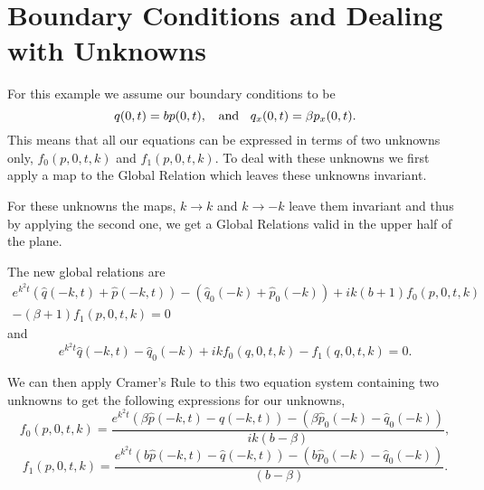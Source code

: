 \documentclass{article}
\begin{document}
\section{Boundary Conditions and Dealing with Unknowns}
For this example we assume our boundary conditions to be
\begin{equation}\label{eq:36}
    q(0,t) = bp(0,t), \hspace{0.75pc} \text{and} \hspace{0.75pc} q_x(0,t) = \beta p_x(0,t).
\end{equation}
This means that all our equations can be expressed in terms of two unknowns only, $f_0(p,0,t,k)$ and $f_1(p,0,t,k)$. To deal with these unknowns we first apply a map to the Global Relation which leaves these unknowns invariant.

For these unknowns the maps, $k \to k$ and $k \to -k$ leave them invariant and thus by applying the second one, we get a Global Relations valid in the upper half of the plane.

The new global relations are 
\begin{multline} \label{eq:37}
   e^{k^2t}(\hat{q}(-k,t) + \hat{p}(-k,t)) - (\hat{q}_0(-k) + \hat{p}_0(-k)) + ik(b+1)f_0(p,0,t,k) \\ - (\beta+1) f_1(p,0,t,k) = 0 
\end{multline}
and
\begin{equation} \label{eq:38}
    e^{k^2t}\hat{q}(-k,t) - \hat{q}_0(-k) + ikf_0(q,0,t,k) -f_1(q,0,t,k) = 0.
\end{equation}

We can then apply Cramer's Rule to this two equation system containing two unknowns to get the following expressions for our unknowns,
\begin{equation} \label{eq:39}
    f_0(p,0,t,k) = \frac{e^{k^2t}(\beta\hat{p}(-k,t) - \hat{q}(-k,t)) - (\beta\hat{p}_0(-k) - \hat{q}_0(-k))}{ik(b-\beta)},
\end{equation}
\begin{equation} \label{eq:40}
    f_1(p,0,t,k) = \frac{e^{k^2t}(b\hat{p}(-k,t) - \hat{q}(-k,t)) - (b\hat{p}_0(-k) - \hat{q}_0(-k))}{(b-\beta)}.
\end{equation}
\end{document}
